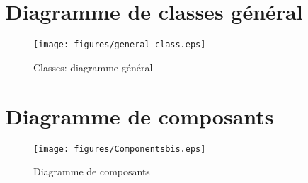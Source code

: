\documentclass[a4paper, 11pt]{report}
\begin{document}
\chapter{Diagramme de classes général}
\begin{figure}[ht]
  \centering
  \texttt{[image: figures/general-class.eps]}
  \caption{\label{fig:Class:General} Classes: diagramme général}
\end{figure}

\chapter{Diagramme de composants}
\label{annexeD}


\begin{figure}[ht]
  \centering
  \texttt{[image: figures/Componentsbis.eps]}
  \caption{\label{fig:CompleteComponents} Diagramme de composants}
\end{figure}

\printindex
\listoffigures
\end{document}
